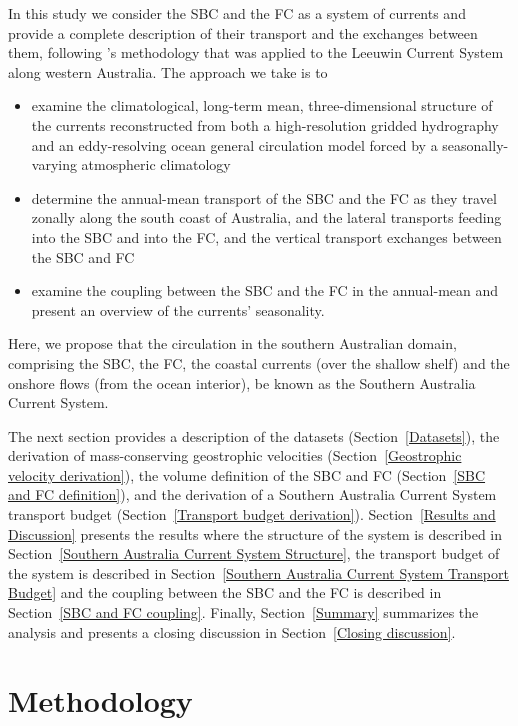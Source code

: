 \documentclass[preprint,3p,review,12pt]{elsarticle}
\newcommand{\citepos}[1]{\citeauthor{#1}'s \citeyearpar{#1}}
\begin{document}
In this study we consider the SBC and the FC as a system of currents and provide a complete description of their transport and the exchanges between them, following \citepos{Furue2017} methodology that was applied to the Leeuwin Current System along western Australia. The approach we take is to
\begin{itemize}
   \item examine the climatological, long-term mean, three-dimensional structure of the currents reconstructed from both a high-resolution gridded hydrography and an eddy-resolving ocean general circulation model forced by a seasonally-varying atmospheric climatology
   \item determine the annual-mean transport of the SBC and the FC as they travel zonally along the south coast of Australia, and the lateral transports feeding into the SBC and into the FC, and the vertical transport exchanges between the SBC and FC
   \item examine the coupling between the SBC and the FC in the annual-mean and present an overview of the currents' seasonality.
\end{itemize}
Here, we propose that the circulation in the southern Australian domain, comprising the SBC, the FC, the coastal currents (over the shallow shelf) and the onshore flows (from the ocean interior), be known as the Southern Australia Current System.

The next section provides a description of the datasets (Section~\ref{Datasets}), the derivation of mass-conserving geostrophic velocities (Section~\ref{Geostrophic velocity derivation}), the volume definition of the SBC and FC (Section~\ref{SBC and FC definition}), and the derivation of a Southern Australia Current System transport budget (Section~\ref{Transport budget derivation}). Section~\ref{Results and Discussion} presents the results where the structure of the system is described in Section~\ref{Southern Australia Current System Structure}, the transport budget of the system is described in Section~\ref{Southern Australia Current System Transport Budget} and the coupling between the SBC and the FC is described in Section~\ref{SBC and FC coupling}. Finally, Section~\ref{Summary} summarizes the analysis and presents a closing discussion in Section~\ref{Closing discussion}.

\section{Methodology} \label{Methodology}
\end{document}
